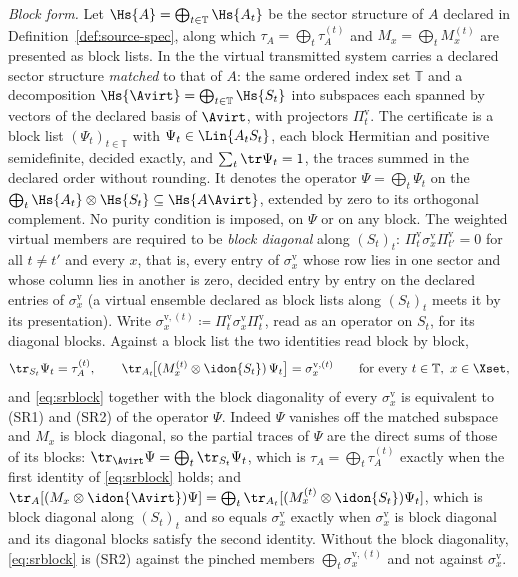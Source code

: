 \begin{definition}
\emph{Block form.} Let $\Hs{A}=\bigoplus_{t\in\mathbb{T}}\Hs{A_t}$ be the
sector structure of $A$ declared in Definition~\ref{def:source-spec}, along
which $\tau_A=\bigoplus_t\tau^{(t)}_A$ and $M_x=\bigoplus_tM^{(t)}_x$ are
presented as block lists. In the  the virtual transmitted
system carries a declared sector structure \emph{matched} to that of $A$: the
same ordered index set $\mathbb{T}$ and a decomposition
$\Hs{\Avirt}=\bigoplus_{t\in\mathbb{T}}\Hs{S_t}$ into subspaces each spanned
by vectors of the declared basis of $\Avirt$, with projectors
$\Pi^{\mathrm v}_t$. The certificate is a block list
$(\Psi_t)_{t\in\mathbb{T}}$ with $\Psi_t\in\Lin{A_tS_t}$, each block
Hermitian and positive semidefinite, decided exactly, and
$\sum_{t}\tr\Psi_t=1$, the traces summed in the declared order without
rounding. It denotes the operator $\Psi=\bigoplus_t\Psi_t$ on the
 $\bigoplus_t\Hs{A_t}\otimes\Hs{S_t}
\subseteq\Hs{A\Avirt}$, extended by zero to its orthogonal complement. No
purity condition is imposed, on $\Psi$ or on any block. The weighted virtual
members are required to be \emph{block diagonal} along $(S_t)_t$:
$\Pi^{\mathrm v}_t\sigma^{\mathrm v}_x\Pi^{\mathrm v}_{t'}=0$ for all
$t\ne t'$ and every $x$, that is, every entry of $\sigma^{\mathrm v}_x$ whose
row lies in one sector and whose column lies in another is zero, decided entry
by entry on the declared entries of $\sigma^{\mathrm v}_x$ (a virtual ensemble
declared as block lists along $(S_t)_t$ meets it by its presentation). Write
$\sigma^{\mathrm v,(t)}_x\coloneqq\Pi^{\mathrm v}_t\sigma^{\mathrm v}_x
\Pi^{\mathrm v}_t$, read as an operator on $S_t$, for its diagonal blocks.
Against a block list the two identities read block by block,
\begin{equation}\label{eq:srblock}
  \tr_{S_t}\Psi_t=\tau^{(t)}_A ,\qquad
  \tr_{A_t}\!\big[(M^{(t)}_x\otimes\idon{S_t})\,\Psi_t\big]
  =\sigma^{\mathrm v,(t)}_x
  \qquad\text{for every }t\in\mathbb{T},\ x\in\Xset ,
\end{equation}
and \eqref{eq:srblock} together with the block diagonality of every
$\sigma^{\mathrm v}_x$ is equivalent to (SR1) and (SR2) of the operator
$\Psi$. Indeed $\Psi$ vanishes off the matched subspace and $M_x$ is block
diagonal, so the partial traces of $\Psi$ are the direct sums of those of its
blocks: $\tr_{\Avirt}\Psi=\bigoplus_t\tr_{S_t}\Psi_t$, which is
$\tau_A=\bigoplus_t\tau^{(t)}_A$ exactly when the first identity of
\eqref{eq:srblock} holds; and $\tr_A[(M_x\otimes\idon{\Avirt})\Psi]=\bigoplus_t
\tr_{A_t}[(M^{(t)}_x\otimes\idon{S_t})\Psi_t]$, which is block diagonal along
$(S_t)_t$ and so equals $\sigma^{\mathrm v}_x$ exactly when
$\sigma^{\mathrm v}_x$ is block diagonal and its diagonal blocks satisfy the
second identity. Without the block diagonality, \eqref{eq:srblock} is (SR2)
against the pinched members $\bigoplus_t\sigma^{\mathrm v,(t)}_x$ and not
against $\sigma^{\mathrm v}_x$.


\end{definition}
